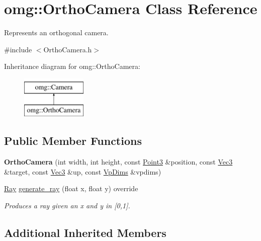 \hypertarget{classomg_1_1_ortho_camera}{}\section{omg\+::Ortho\+Camera Class Reference}
\label{classomg_1_1_ortho_camera}


Represents an orthogonal camera.  




{\ttfamily \#include $<$Ortho\+Camera.\+h$>$}

Inheritance diagram for omg\+::Ortho\+Camera\+:\begin{figure}[H]
\begin{center}
\leavevmode
\includegraphics[height=2.000000cm]{classomg_1_1_ortho_camera}
\end{center}
\end{figure}
\subsection*{Public Member Functions}
\begin{DoxyCompactItemize}
\item 
\mbox{\label{classomg_1_1_ortho_camera_a120f8b1856b9603b692fdf69482fa1fe}} 
{\bfseries Ortho\+Camera} (int width, int height, const \mbox{\hyperlink{namespaceomg_af85242d35fdacf829d32a6f9b95f3e35}{Point3}} \&position, const \mbox{\hyperlink{namespaceomg_a45a9482677fee9933ff369b49894e316}{Vec3}} \&target, const \mbox{\hyperlink{namespaceomg_a45a9482677fee9933ff369b49894e316}{Vec3}} \&up, const \mbox{\hyperlink{structomg_1_1_camera_1_1_vp_dims}{Vp\+Dims}} \&vpdims)
\item 
\mbox{\hyperlink{classomg_1_1_ray}{Ray}} \mbox{\hyperlink{classomg_1_1_ortho_camera_af5dba96ad9cdf91121093d0c9d72e57f}{generate\+\_\+ray}} (float x, float y) override
\begin{DoxyCompactList}\small\item\em Produces a ray given an x and y in \mbox{[}0,1\mbox{]}. \end{DoxyCompactList}\end{DoxyCompactItemize}
\subsection*{Additional Inherited Members}


